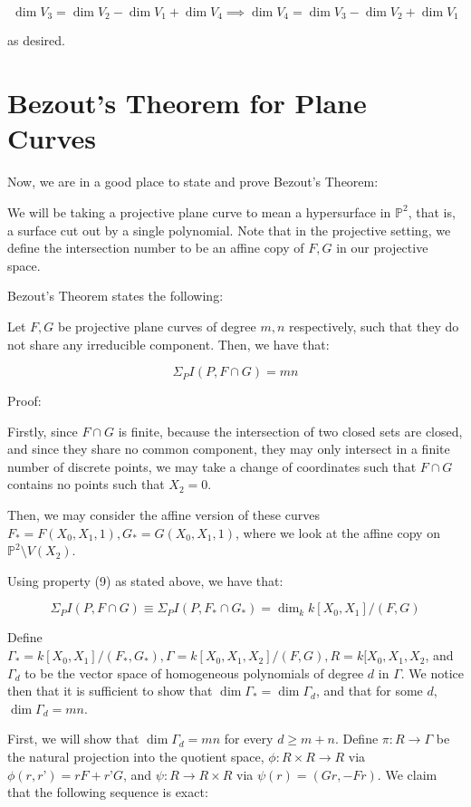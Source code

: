 \documentclass[10pt]{article}
\begin{document}
$$ \dim V_3 = \dim V_2 - \dim V_1 + \dim V_4 \implies \dim V_4 = \dim V_3 - \dim V_2 + \dim V_1$$

as desired.

\section{Bezout’s Theorem for Plane Curves}

Now, we are in a good place to state and prove Bezout’s Theorem:

We will be taking a projective plane curve to mean a hypersurface in $\mathbb{P}^2$, that is, a surface cut out by a single polynomial. Note that in the projective setting, we define the intersection number to be an affine copy of $F,G$ in our projective space.

Bezout’s Theorem states the following:

Let $F, G$ be projective plane curves of degree $m,n$ respectively, such that they do not share any irreducible component. Then, we have that:

$$\Sigma_P I(P,F \cap G) = mn $$

Proof:

Firstly, since $F \cap G$ is finite, because the intersection of two closed sets are closed, and since they share no common component, they may only intersect in a finite number of discrete points, we may take a change of coordinates such that $F \cap G$  contains no points such that $X_2 = 0$.

Then, we may consider the affine version of these curves $F_* = F(X_0,X_1, 1), G_*= G(X_0,X_1, 1)$, where we look at the affine copy on $\mathbb{P}^2 \setminus V(X_2)$. 

Using property (9) as stated above, we have that:

$$\Sigma_P I(P,F \cap G) \equiv \Sigma_P I(P,F_* \cap G_*) = \dim_k k[X_0,X_1]/(F,G) $$

Define $\Gamma_* = k[X_0,X_1]/(F_*, G_*), \Gamma = k[X_0,X_1,X_2]/(F,G), R = k[X_0,X_1,X_2$, and $\Gamma_d$ to be the vector space of homogeneous polynomials of degree $d$ in $\Gamma$. We notice then that it is sufficient to show that $\dim \Gamma_* = \dim \Gamma_d$, and that for some $d$, $\dim \Gamma_d = mn$.

First, we will show that $\dim \Gamma_d = mn$ for every $d \geq m+ n$. Define $\pi: R \to \Gamma$ be the natural projection into the quotient space, $\phi: R \times R \to R$ via $\phi(r,r’) = rF + r’G$, and $\psi: R \to R \times R$ via $\psi(r) = (Gr, -Fr)$. We claim that the following sequence is exact:
\end{document}
